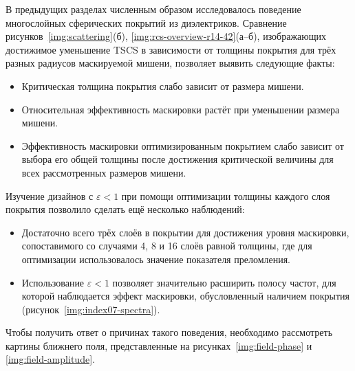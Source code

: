 В предыдущих разделах численным образом исследовалось поведение
многослойных сферических покрытий из диэлектриков. Сравнение
рисунков~\ref{img:scattering}(б), \ref{img:rcs-overview-r14-42}(а--б),
изображающих достижимое уменьшение TSCS в зависимости от толщины
покрытия для трёх разных радиусов маскируемой мишени, позволяет
выявить следующие факты:
\begin{itemize}
\item Критическая толщина покрытия слабо зависит от размера мишени.
\item Относительная эффективность маскировки растёт при уменьшении
  размера мишени.
\item Эффективность маскировки оптимизированным покрытием слабо зависит
  от выбора его общей толщины после достижения критической
  величины для всех рассмотренных размеров мишени.
\end{itemize}
Изучение дизайнов с ${\varepsilon<1}$ при помощи  оптимизации
толщины каждого слоя покрытия позволило сделать ещё несколько
наблюдений:
\begin{itemize}
\item Достаточно всего трёх слоёв в покрытии для достижения уровня
  маскировки, сопоставимого со случаями 4, 8 и 16 слоёв равной толщины,
  где для оптимизации использовалось значение показателя преломления.
\item Использование ${\varepsilon<1}$ позволяет значительно расширить
  полосу частот, для которой наблюдается эффект маскировки,
  обусловленный наличием покрытия (рисунок~\ref{img:index07-spectra}).
\end{itemize}
Чтобы получить ответ о причинах такого поведения, необходимо
рассмотреть картины ближнего поля, представленные на
рисунках~\ref{img:field-phase} и \ref{img:field-amplitude}.


